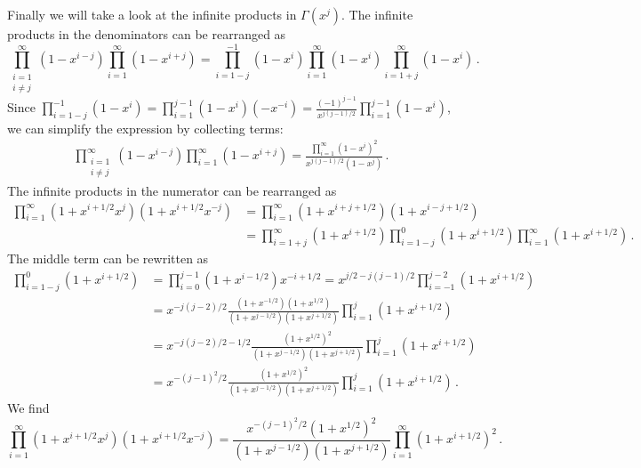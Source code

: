 \documentclass[a4paper,11pt]{article}
\begin{document}
Finally we will take a look at the infinite products in $\Gamma(x^j)$. The infinite products in the denominators can be rearranged as
\begin{equation}
	\prod_{\substack{i=1\\i\neq j}}^\infty (1-x^{i-j}) \prod_{i=1}^\infty (1-x^{i+j}) = \prod_{i=1-j}^{-1} (1-x^i)\prod_{i=1}^\infty (1-x^i) \prod_{i=1+j}^\infty (1-x^i)\,.
\end{equation}
Since $\prod_{i=1-j}^{-1}(1-x^i) = \prod_{i=1}^{j-1}(1-x^i)(-x^{-i}) = \frac{(-1)^{j-1}}{x^{j(j-1)/2}}\prod_{i=1}^{j-1}(1-x^i)$, we can simplify the expression by collecting terms:
\begin{equation}
\begin{split}
	\prod_{\substack{i=1\\i\neq j}}^\infty (1-x^{i-j}) \prod_{i=1}^\infty (1-x^{i+j}) = \frac{\prod_{i=1}^\infty (1-x^i)^2}{x^{j(j-1)/2}(1-x^j)}\,. 
\end{split}
\end{equation}
The infinite products in the numerator can be rearranged as
\begin{equation}
\begin{split}
	\prod_{i=1}^\infty (1+x^{i+1/2}x^j)(1+x^{i+1/2}x^{-j})
	&= \prod_{i=1}^\infty (1+x^{i+j+1/2})(1+x^{i-j+1/2})\\
	&= \prod_{i=1+j}^\infty (1+x^{i+1/2}) \prod_{i=1-j}^{0} (1+x^{i+1/2}) \prod_{i=1}^\infty (1+x^{i+1/2})\,.
\end{split}
\end{equation}
The middle term can be rewritten as
\begin{equation}
\begin{split}
	\prod_{i=1-j}^{0} (1+x^{i+1/2}) &= \prod_{i=0}^{j-1} (1+x^{i-1/2})x^{-i+1/2}
	 = x^{j/2-j(j-1)/2} \prod_{i=-1}^{j-2} (1+x^{i+1/2})\\
	&= x^{-j(j-2)/2} \frac{(1+x^{-1/2})(1+x^{1/2})}{(1+x^{j-1/2})(1+x^{j+1/2})} \prod_{i=1}^{j} (1+x^{i+1/2})\\
	&= x^{-j(j-2)/2 - 1/2} \frac{(1+x^{1/2})^2}{(1+x^{j-1/2})(1+x^{j+1/2})} \prod_{i=1}^{j} (1+x^{i+1/2})\\
	&= x^{-(j-1)^2/2} \frac{(1+x^{1/2})^2}{(1+x^{j-1/2})(1+x^{j+1/2})} \prod_{i=1}^{j} (1+x^{i+1/2})\,.
\end{split}
\end{equation}
We find
\begin{equation}
	\prod_{i=1}^\infty (1+x^{i+1/2}x^j)(1+x^{i+1/2}x^{-j}) = \frac{x^{-(j-1)^2/2}(1+x^{1/2})^2}{(1+x^{j-1/2})(1+x^{j+1/2})} \prod_{i=1}^\infty (1+x^{i+1/2})^2\,.
\end{equation}
\end{document}
